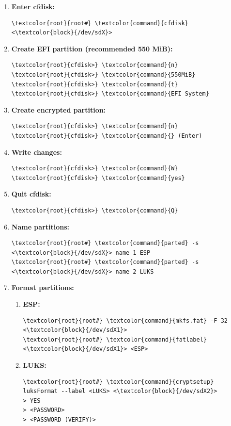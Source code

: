 \documentclass[10pt, a4paper, onecolumn, oneside, titlepage, openany]{book}
\begin{document}
\begin{enumerate}
    \item \textbf{Enter cfdisk:}
\begin{Verbatim}[commandchars=\\\{\}]
\textcolor{root}{root#} \textcolor{command}{cfdisk} <\textcolor{block}{/dev/sdX}>
\end{Verbatim}
    \item \textbf{Create EFI partition (recommended 550 MiB):}
\begin{Verbatim}[commandchars=\\\{\}]
\textcolor{root}{cfdisk>} \textcolor{command}{n}
\textcolor{root}{cfdisk>} \textcolor{command}{550MiB}
\textcolor{root}{cfdisk>} \textcolor{command}{t}
\textcolor{root}{cfdisk>} \textcolor{command}{EFI System}
\end{Verbatim}
    \item \textbf{Create encrypted partition:}
\begin{Verbatim}[commandchars=\\\{\}]
\textcolor{root}{cfdisk>} \textcolor{command}{n}
\textcolor{root}{cfdisk>} \textcolor{command}{} (Enter)
\end{Verbatim}
    \item \textbf{Write changes:}
\begin{Verbatim}[commandchars=\\\{\}]
\textcolor{root}{cfdisk>} \textcolor{command}{W}
\textcolor{root}{cfdisk>} \textcolor{command}{yes}
\end{Verbatim}
    \item \textbf{Quit cfdisk:}
\begin{Verbatim}[commandchars=\\\{\}]
\textcolor{root}{cfdisk>} \textcolor{command}{Q}
\end{Verbatim}
    \item \textbf{Name partitions:}
\begin{Verbatim}[commandchars=\\\{\}]
\textcolor{root}{root#} \textcolor{command}{parted} -s <\textcolor{block}{/dev/sdX}> name 1 ESP
\textcolor{root}{root#} \textcolor{command}{parted} -s <\textcolor{block}{/dev/sdX}> name 2 LUKS
\end{Verbatim}
    \item \textbf{Format partitions:}
    \begin{enumerate}
        \item \textbf{ESP:}
\begin{Verbatim}[commandchars=\\\{\}]
\textcolor{root}{root#} \textcolor{command}{mkfs.fat} -F 32 <\textcolor{block}{/dev/sdX1}>
\textcolor{root}{root#} \textcolor{command}{fatlabel} <\textcolor{block}{/dev/sdX1}> <ESP>
\end{Verbatim}
        \item \textbf{LUKS:}
\begin{Verbatim}[commandchars=\\\{\}]
\textcolor{root}{root#} \textcolor{command}{cryptsetup} luksFormat --label <LUKS> <\textcolor{block}{/dev/sdX2}>
> YES
> <PASSWORD>
> <PASSWORD (VERIFY)>
\end{Verbatim}
    \end{enumerate}
\end{enumerate}
\end{document}
